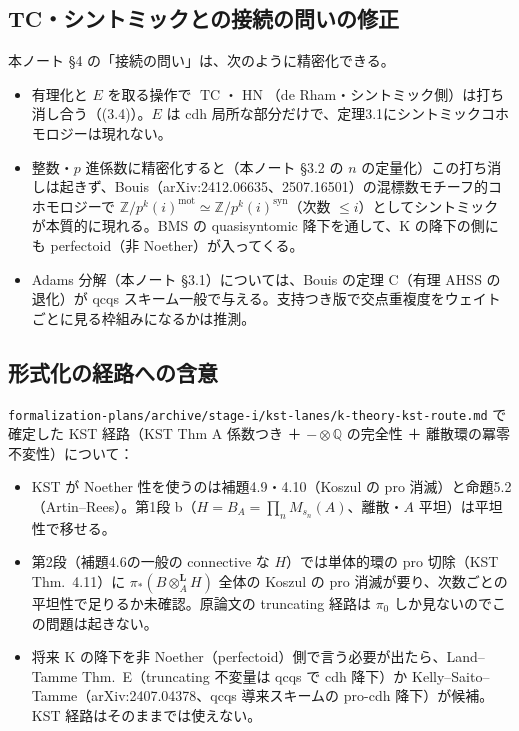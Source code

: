 \documentclass[11pt,a4paper]{ltjsarticle}
\theoremstyle{plain}
\theoremstyle{definition}
\theoremstyle{remark}
\newcommand{\Q}{\mathbb{Q}}
\newcommand{\Z}{\mathbb{Z}}
\newcommand{\TC}{\operatorname{TC}}
\newcommand{\Lotimes}{\otimes^{\mathbf{L}}}
\begin{document}
\subsection{TC・シントミックとの接続の問いの修正}
本ノート §4 の「接続の問い」は、次のように精密化できる。
\begin{itemize}
  \item 有理化と $E$ を取る操作で $\TC$・$\operatorname{HN}$（de Rham・シントミック側）は打ち消し合う（(3.4)）。$E$ は cdh 局所な部分だけで、定理3.1にシントミックコホモロジーは現れない。
  \item 整数・$p$ 進係数に精密化すると（本ノート §3.2 の $n$ の定量化）この打ち消しは起きず、Bouis（arXiv:2412.06635、2507.16501）の混標数モチーフ的コホモロジーで $\Z/p^k(i)^{\mathrm{mot}}\simeq\Z/p^k(i)^{\mathrm{syn}}$（次数 $\le i$）としてシントミックが本質的に現れる。BMS の quasisyntomic 降下を通して、K の降下の側にも perfectoid（非 Noether）が入ってくる。
  \item Adams 分解（本ノート §3.1）については、Bouis の定理 C（有理 AHSS の退化）が qcqs スキーム一般で与える。支持つき版で交点重複度をウェイトごとに見る枠組みになるかは推測。
\end{itemize}

\subsection{形式化の経路への含意}
\texttt{formalization-plans/archive/stage-i/kst-lanes/k-theory-kst-route.md} で確定した KST 経路（KST Thm A 係数つき ＋ $-\otimes\Q$ の完全性 ＋ 離散環の冪零不変性）について：
\begin{itemize}
  \item KST が Noether 性を使うのは補題4.9・4.10（Koszul の pro 消滅）と命題5.2（Artin--Rees）。第1段 b（$H=B_A=\prod_n M_{s_n}(A)$、離散・$A$ 平坦）は平坦性で移せる。
  \item 第2段（補題4.6の一般の connective な $H$）では単体的環の pro 切除（KST Thm.~4.11）に $\pi_*(B\Lotimes_A H)$ 全体の Koszul の pro 消滅が要り、次数ごとの平坦性で足りるか未確認。原論文の truncating 経路は $\pi_0$ しか見ないのでこの問題は起きない。
  \item 将来 K の降下を非 Noether（perfectoid）側で言う必要が出たら、Land--Tamme Thm.~E（truncating 不変量は qcqs で cdh 降下）か Kelly--Saito--Tamme（arXiv:2407.04378、qcqs 導来スキームの pro-cdh 降下）が候補。KST 経路はそのままでは使えない。
\end{itemize}
\end{document}
